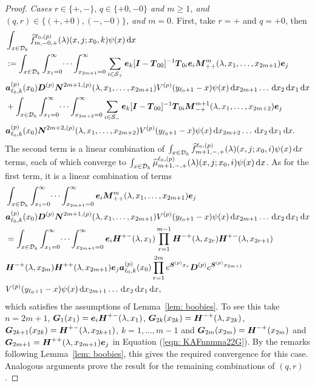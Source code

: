 \begin{proof}
	\textit{Cases \(r \in \{+,-\},\, q\in\{+0,-0\} \) and \(m\geq 1\), and \((q,r) \in \{(+,+0),(-,-0)\}\), and \(m=0\).} First, take \(r=+\) and \(q=+0\), then 
	\begin{align}
		&\int_{x\in\mathcal{D}_k}\widehat{f}_{m,-0,+}^{\ell_0,(p)}(\lambda)(x,j;x_0,k)\psi(x)\, \mathrm{d} x \nonumber 
		\\&:=\int_{x\in\mathcal{D}_k}\int_{x_1=0}^\infty \dots \int_{x_{2m+1}=0}^\infty \sum_{i\in\mathcal{S}_+} \boldsymbol e_k [\boldsymbol I - \boldsymbol T_{00}]^{-1}\boldsymbol T_{0i}\boldsymbol e_i \boldsymbol M^m_{++}(\lambda,x_1,\dots,x_{2m+1})\boldsymbol e_j \nonumber
		\\& \boldsymbol a_{\ell_0,k}^{(p)}(x_0) \boldsymbol D^{(p)} \boldsymbol N^{2m+1,(p)}(\lambda,x_1,\dots,x_{2m+1}) V^{(p)}(y_{\ell_0+1}-x)\psi(x)\, \mathrm{d} x_{2m+1}\dots\, \mathrm{d} x_2 \, \mathrm{d} x_1  \, \mathrm{d} x\nonumber
		\\& + \int_{x\in\mathcal{D}_k}\int_{x_1=0}^\infty \dots \int_{x_{2m+2}=0}^\infty \sum_{i\in\mathcal{S}_-} \boldsymbol e_k [\boldsymbol I - \boldsymbol T_{00}]^{-1}\boldsymbol T_{0i}\boldsymbol M^{m+1}_{-+}(\lambda,x_1,\dots,x_{2m+2})\boldsymbol e_j \nonumber
		\\& \boldsymbol a_{\ell_0,k}^{(p)}(x_0)\boldsymbol N^{2m+2,(p)}(\lambda,x_1,\dots,x_{2m+2}) V^{(p)}(y_{\ell_0+1}-x)\psi(x)\, \mathrm{d} x_{2m+2}\dots\, \mathrm{d} x_2 \, \mathrm{d} x_1 \, \mathrm{d} x.
	\end{align}
	The second term is a linear combination of \(\int_{x\in\mathcal{D}_k}\widehat{f}_{m+1,-,+}^{\ell_0,(p)}(\lambda)(x,j;x_0,i) \psi(x)\, \mathrm{d} x\) terms, each of which converge to \(\int_{x\in\mathcal{D}_k}\widehat{\mu}_{m+1,-,+}^{\ell_0,(p)}(\lambda)(x,j;x_0,i) \psi(x)\, \mathrm{d} x\).
	As for the first term, it is a linear combination of terms 
	\begin{align*}
		&\int_{x\in\mathcal{D}_k}\int_{x_1=0}^\infty \dots \int_{x_{2m+1}=0}^\infty \boldsymbol e_i \boldsymbol M^m_{++}(\lambda,x_1,\dots,x_{2m+1})\boldsymbol e_j \nonumber
		\\& \boldsymbol a_{\ell_0,k}^{(p)}(x_0)\boldsymbol D^{(p)}\boldsymbol N^{2m+1,(p)}(\lambda,x_1,\dots,x_{2m+1}) V^{(p)}(y_{\ell_0+1}-x)\psi(x)\, \mathrm{d} x_{2m+1}\dots\, \mathrm{d} x_2 \, \mathrm{d} x_1 \, \mathrm{d} x
		\\&=\int_{x\in\mathcal{D}_k}\int_{x_1=0}^\infty \dots \int_{x_{2m+1}=0}^\infty \boldsymbol e_i \boldsymbol H^{+-}(\lambda,x_1)\prod_{r=1}^{m-1}\boldsymbol H^{-+}(\lambda,x_{2r}) \boldsymbol H^{+-}(\lambda,x_{2r+1}) \\&\boldsymbol H^{-+}(\lambda,x_{2m}) 
		\boldsymbol H^{++}(\lambda,x_{2m+1})\boldsymbol e_j \nonumber
		\boldsymbol a_{\ell_0,k}^{(p)}(x_0)\prod_{r=1}^{2m} e^{\boldsymbol{S}^{(p)}x_{r}}\boldsymbol{D}^{(p)} e^{\boldsymbol{S}^{(p)}x_{2m+1}}
		\\& V^{(p)}(y_{\ell_0+1}-x)\psi(x)\, \mathrm{d} x_{2m+1}\dots\, \mathrm{d} x_2 \, \mathrm{d} x_1 \, \mathrm{d} x,
	\end{align*}
	which satisfies the assumptions of Lemma~\ref{lem: boobies}. To see this take \(n=2m+1\), \(\boldsymbol G_1(x_1) = \boldsymbol e_i\boldsymbol H^{+-}(\lambda, x_1)\), \(\boldsymbol G_{2k}(x_{2k}) = \boldsymbol H^{-+}(\lambda, x_{2k})\), \(\boldsymbol G_{2k+1}(x_{2k}) = \boldsymbol H^{+-}(\lambda, x_{2k+1})\), \(k=1,\dots,m-1\) and \(\boldsymbol G_{2m}(x_{2m}) = \boldsymbol H^{-+}(x_{2m})\) and \(\boldsymbol G_{2m+1} = \boldsymbol H^{++}(\lambda,x_{2m+1})\boldsymbol e_j\) in Equation (\ref{eqn: KAFnnmna22G}). By the remarks following Lemma~\ref{lem: boobies}, this gives the required convergence for this case. Analogous arguments prove the result for the remaining combinations of \((q,r)\). 
\end{proof}

